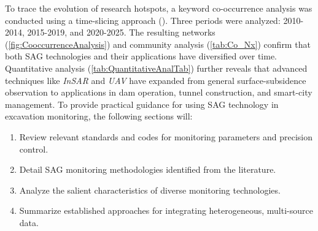 \documentclass[preprint,11pt,authoryear,3p]{elsarticle}
\begin{document}
To trace the evolution of research hotspots, a keyword co-occurrence analysis was conducted using a time-slicing approach (\citep{Lee01042010}). Three periods were analyzed: 2010-2014, 2015-2019, and 2020-2025. The resulting networks (\autoref{fig:CooccurrenceAnalysis}) and community analysis (\autoref{tab:Co_Nx}) confirm that both SAG technologies and their applications have diversified over time. Quantitative analysis (\autoref{tab:QuantitativeAnalTab}) further reveals that advanced techniques like \emph{InSAR} and \emph{UAV} have expanded from general surface-subsidence observation to applications in dam operation, tunnel construction, and smart-city management. 
To provide practical guidance for using SAG technology in excavation monitoring, the following sections will:

\begin{enumerate}
    \item Review relevant standards and codes for monitoring parameters and precision control.
    \item Detail SAG monitoring methodologies identified from the literature.
    \item Analyze the salient characteristics of diverse monitoring technologies.
    \item Summarize established approaches for integrating heterogeneous, multi-source data.
\end{enumerate}
\end{document}
